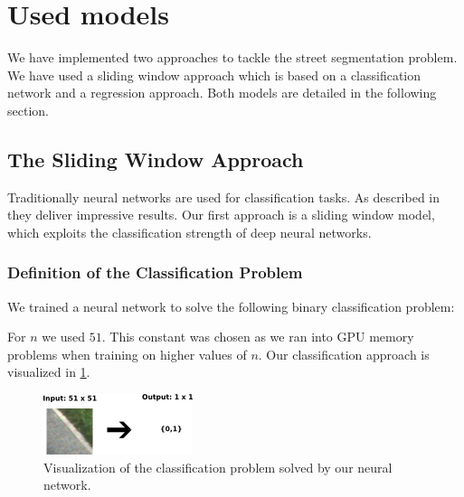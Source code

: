 
\section{Used models}\label{sec:model}

We have implemented two approaches to tackle  the street segmentation problem.
We have used a sliding window approach which is based on a classification
network and a regression approach. Both models are detailed in the following
section.

\subsection{The Sliding Window Approach}
Traditionally neural networks are used for classification tasks. As
described in  they deliver impressive results. Our first
approach is a sliding window model, which exploits the classification strength
of deep neural networks.

\subsubsection{Definition of the Classification Problem}
We trained a neural network to solve the following binary classification
problem:


For $n$ we used $51$. This constant was chosen as we ran into GPU memory
problems when training on higher values of $n$. Our classification approach is
visualized in \cref{fig:figure}.

\begin{figure}[H]
	\centering
	\includegraphics[width=0.5\columnwidth]{figures/models/sliding_window.png}
	\caption{Visualization of the classification problem solved by our neural network.}
	\label{fig:figure}
\end{figure}


